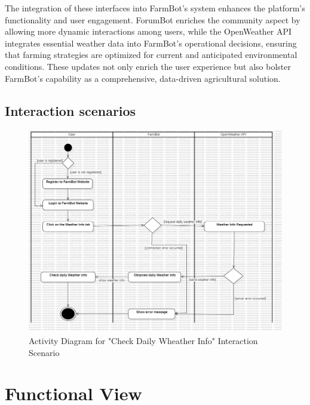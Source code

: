 The integration of these interfaces into FarmBot’s system enhances the platform's functionality and user engagement. ForumBot enriches the community aspect by allowing more dynamic interactions among users, while the OpenWeather API integrates essential weather data into FarmBot’s operational decisions, ensuring that farming strategies are optimized for current and anticipated environmental conditions. These updates not only enrich the user experience but also bolster FarmBot’s capability as a comprehensive, data-driven agricultural solution.

\newpage
\subsection{Interaction scenarios}
\begin{figure}[htbp]
    \centering
    \includegraphics[width=1\linewidth]{Figures/activity3.jpg}
    \caption{Activity Diagram for "Check Daily Wheather Info" Interaction Scenario}
    \label{Activity3}
\end{figure}
\newpage

\section{Functional View}

